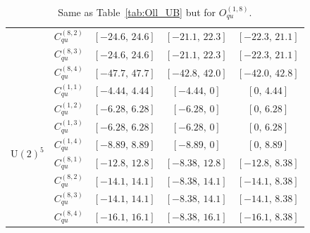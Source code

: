 \begin{table}[tbp]
{\begin{tabular}{ccccc}
        & $C_{qu}^{(8,2)}$ & $[-24.6,\, 24.6]$ & $[-21.1,\, 22.3]$ & $[-22.3,\, 21.1]$ \\
        & $C_{qu}^{(8,3)}$ & $[-24.6,\, 24.6]$ & $[-21.1,\, 22.3]$ & $[-22.3,\, 21.1]$ \\
        & $C_{qu}^{(8,4)}$ & $[-47.7,\, 47.7]$ & $[-42.8,\, 42.0]$ & $[-42.0,\, 42.8]$ \\
    \midrule
    \multirow{8}{*}{$\mathrm{U}(2)^5$}
        & $C_{qu}^{(1,1)}$ & $[-4.44,\, 4.44]$ & $[-4.44,\, 0]$    & $[0,\, 4.44]$    \\
        & $C_{qu}^{(1,2)}$ & $[-6.28,\, 6.28]$ & $[-6.28,\, 0]$    & $[0,\, 6.28]$    \\
        & $C_{qu}^{(1,3)}$ & $[-6.28,\, 6.28]$ & $[-6.28,\, 0]$    & $[0,\, 6.28]$    \\
        & $C_{qu}^{(1,4)}$ & $[-8.89,\, 8.89]$ & $[-8.89,\, 0]$    & $[0,\, 8.89]$    \\
        & $C_{qu}^{(8,1)}$ & $[-12.8,\, 12.8]$ & $[-8.38,\, 12.8]$ & $[-12.8,\, 8.38]$ \\
        & $C_{qu}^{(8,2)}$ & $[-14.1,\, 14.1]$ & $[-8.38,\, 14.1]$ & $[-14.1,\, 8.38]$ \\
        & $C_{qu}^{(8,3)}$ & $[-14.1,\, 14.1]$ & $[-8.38,\, 14.1]$ & $[-14.1,\, 8.38]$ \\
        & $C_{qu}^{(8,4)}$ & $[-16.1,\, 16.1]$ & $[-8.38,\, 16.1]$ & $[-16.1,\, 8.38]$ \\
    \bottomrule
\end{tabular}}
\caption{Same as Table~\ref{tab:Oll_UB} but for $O_{qu}^{(1,8)}$.}
\label{tab:Oqu_UB}
\end{table}

